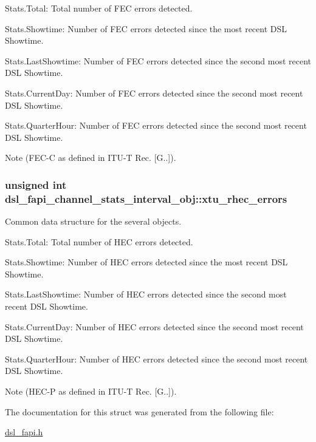 \begin{DoxyItemize}
\item Stats.\-Total\-: Total number of F\-E\-C errors detected.
\item Stats.\-Showtime\-: Number of F\-E\-C errors detected since the most recent D\-S\-L Showtime.
\item Stats.\-Last\-Showtime\-: Number of F\-E\-C errors detected since the second most recent D\-S\-L Showtime.
\item Stats.\-Current\-Day\-: Number of F\-E\-C errors detected since the second most recent D\-S\-L Showtime.
\item Stats.\-Quarter\-Hour\-: Number of F\-E\-C errors detected since the second most recent D\-S\-L Showtime. \begin{DoxyNote}{Note}
(F\-E\-C-\/\-C as defined in I\-T\-U-\/\-T Rec. \mbox{[}G..\mbox{]}). 
\end{DoxyNote}

\end{DoxyItemize}\hypertarget{structdsl__fapi__channel__stats__interval__obj_ad9b8601436c226deb150bb49bb70ec2f}{
\subsubsection[{xtu\-\_\-rhec\-\_\-errors}]{\setlength{\rightskip}{0pt plus 5cm}unsigned int dsl\-\_\-fapi\-\_\-channel\-\_\-stats\-\_\-interval\-\_\-obj\-::xtu\-\_\-rhec\-\_\-errors}}\label{structdsl__fapi__channel__stats__interval__obj_ad9b8601436c226deb150bb49bb70ec2f}
Common data structure for the several objects.
\begin{DoxyItemize}
\item Stats.\-Total\-: Total number of H\-E\-C errors detected.
\item Stats.\-Showtime\-: Number of H\-E\-C errors detected since the most recent D\-S\-L Showtime.
\item Stats.\-Last\-Showtime\-: Number of H\-E\-C errors detected since the second most recent D\-S\-L Showtime.
\item Stats.\-Current\-Day\-: Number of H\-E\-C errors detected since the second most recent D\-S\-L Showtime.
\item Stats.\-Quarter\-Hour\-: Number of H\-E\-C errors detected since the second most recent D\-S\-L Showtime. \begin{DoxyNote}{Note}
(H\-E\-C-\/\-P as defined in I\-T\-U-\/\-T Rec. \mbox{[}G..\mbox{]}). 
\end{DoxyNote}

\end{DoxyItemize}

The documentation for this struct was generated from the following file\-:\begin{DoxyCompactItemize}
\item 
\hyperlink{dsl__fapi_8h}{dsl\-\_\-fapi.\-h}\end{DoxyCompactItemize}
